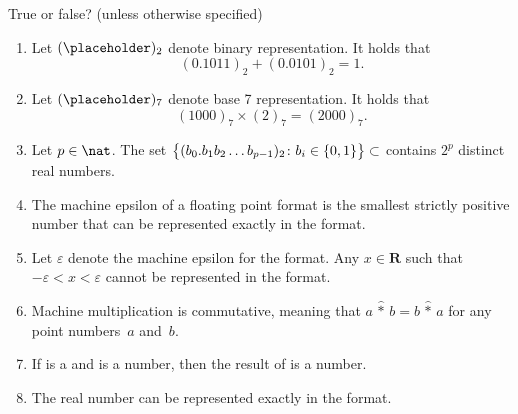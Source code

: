 \documentclass[a4paper]{article}
\begin{document}
\pagestyle{empty}
\thispagestyle{fancy}



True or false? (unless otherwise specified)

\begin{enumerate}

    \item
        Let $(\placeholder)_2$ denote binary representation.
        It holds that
        \[
            (0.1011)_2 + (0.0101)_2 = 1.
        \]

    \item
        Let $(\placeholder)_7$ denote base 7 representation.
        It holds that
        \[
            (1000)_7 \times (2)_7 = (2000)_7.
        \]

    \item
        Let $p \in \nat$.
        The set
        \(
            \bigl\{ (b_0. b_1 b_2 \dots b_{p-1})_2 \colon b_i \in \{0, 1\} \bigr\} \subset \real
        \)
        contains $2^{p}$ distinct real numbers.

    \item
        The machine epsilon of a floating point format is the smallest strictly positive number that can be represented exactly in the format.

    \item
        Let $\varepsilon$ denote the machine epsilon for the  format.
        Any $x \in \mathbf R$ such that $-\varepsilon < x < \varepsilon$
        cannot be represented in the  format.

    \item
        Machine multiplication is commutative,
        meaning that $a \,{\widehat *}\, b = b \, {\widehat *}\, a$
        for any  point numbers~$a$ and~$b$.

    \item
        If  is a  and  is a  number,
        then the result of  is a  number.

    \item
        The real number  can be represented exactly in the  format.


\end{enumerate}
\end{document}
